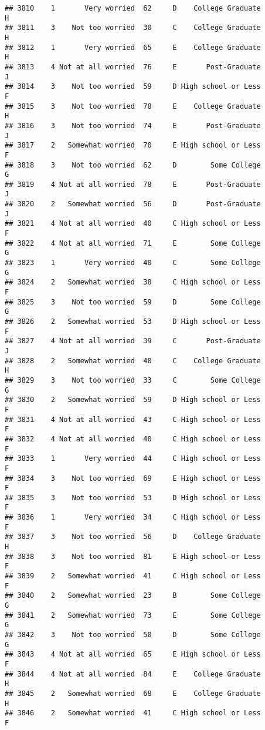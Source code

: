 \documentclass[
]{article}
\begin{document}
\begin{verbatim}
## 3810    1       Very worried  62     D    College Graduate         H
## 3811    3    Not too worried  30     C    College Graduate         H
## 3812    1       Very worried  65     E    College Graduate         H
## 3813    4 Not at all worried  76     E       Post-Graduate         J
## 3814    3    Not too worried  59     D High school or Less         F
## 3815    3    Not too worried  78     E    College Graduate         H
## 3816    3    Not too worried  74     E       Post-Graduate         J
## 3817    2   Somewhat worried  70     E High school or Less         F
## 3818    3    Not too worried  62     D        Some College         G
## 3819    4 Not at all worried  78     E       Post-Graduate         J
## 3820    2   Somewhat worried  56     D       Post-Graduate         J
## 3821    4 Not at all worried  40     C High school or Less         F
## 3822    4 Not at all worried  71     E        Some College         G
## 3823    1       Very worried  40     C        Some College         G
## 3824    2   Somewhat worried  38     C High school or Less         F
## 3825    3    Not too worried  59     D        Some College         G
## 3826    2   Somewhat worried  53     D High school or Less         F
## 3827    4 Not at all worried  39     C       Post-Graduate         J
## 3828    2   Somewhat worried  40     C    College Graduate         H
## 3829    3    Not too worried  33     C        Some College         G
## 3830    2   Somewhat worried  59     D High school or Less         F
## 3831    4 Not at all worried  43     C High school or Less         F
## 3832    4 Not at all worried  40     C High school or Less         F
## 3833    1       Very worried  44     C High school or Less         F
## 3834    3    Not too worried  69     E High school or Less         F
## 3835    3    Not too worried  53     D High school or Less         F
## 3836    1       Very worried  34     C High school or Less         F
## 3837    3    Not too worried  56     D    College Graduate         H
## 3838    3    Not too worried  81     E High school or Less         F
## 3839    2   Somewhat worried  41     C High school or Less         F
## 3840    2   Somewhat worried  23     B        Some College         G
## 3841    2   Somewhat worried  73     E        Some College         G
## 3842    3    Not too worried  50     D        Some College         G
## 3843    4 Not at all worried  65     E High school or Less         F
## 3844    4 Not at all worried  84     E    College Graduate         H
## 3845    2   Somewhat worried  68     E    College Graduate         H
## 3846    2   Somewhat worried  41     C High school or Less         F

\end{verbatim}
\end{document}
